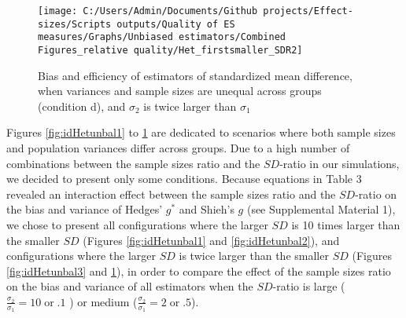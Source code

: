 \documentclass[
  12pt,
  french,
]{article}
\begin{document}
\begin{figure}

{\centering \texttt{[image: C:/Users/Admin/Documents/Github projects/Effect-sizes/Scripts outputs/Quality of ES measures/Graphs/Unbiased estimators/Combined Figures\_relative quality/Het\_firstsmaller\_SDR2]} 

}

\caption{Bias and efficiency of estimators of standardized mean difference, when variances and sample sizes are unequal across groups (condition d), and $\sigma_2$ is twice larger than $\sigma_1$}\label{fig:idHetunbal4}
\end{figure}
\newpage

Figures \ref{fig:idHetunbal1} to \ref{fig:idHetunbal4} are dedicated to
scenarios where both sample sizes and population variances differ across
groups. Due to a high number of combinations between the sample sizes
ratio and the \(SD\)-ratio in our simulations, we decided to present
only some conditions. Because equations in Table 3 revealed an
interaction effect between the sample sizes ratio and the \(SD\)-ratio
on the bias and variance of Hedges' \(g^*\) and Shieh's \(g\) (see
Supplemental Material 1), we chose to present all configurations where
the larger \(SD\) is 10 times larger than the smaller \(SD\) (Figures
\ref{fig:idHetunbal1} and \ref{fig:idHetunbal2}), and configurations
where the larger \(SD\) is twice larger than the smaller \(SD\) (Figures
\ref{fig:idHetunbal3} and \ref{fig:idHetunbal4}), in order to compare
the effect of the sample sizes ratio on the bias and variance of all
estimators when the \(SD\)-ratio is large
(\(\frac{\sigma_2}{\sigma_1}=10 \; \mathrm{or} \; .1\) ) or medium
(\(\frac{\sigma_2}{\sigma_1}=2 \; \mathrm{or} \; .5\)).
\end{document}
